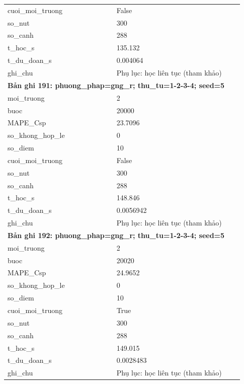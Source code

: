 \begin{longtable}{p{0.43\linewidth}p{0.50\linewidth}}
cuoi\_\allowbreak moi\_\allowbreak truong & False \\
so\_\allowbreak nut & 300 \\
so\_\allowbreak canh & 288 \\
t\_\allowbreak hoc\_\allowbreak s & 135.132 \\
t\_\allowbreak du\_\allowbreak doan\_\allowbreak s & 0.004064 \\
ghi\_\allowbreak chu & Phụ lục: học liên tục (tham khảo) \\
\midrule
\multicolumn{2}{p{0.95\linewidth}}{\textbf{Bản ghi 191: phuong\_phap=gng\_r; thu\_tu=1-2-3-4; seed=5}} \\
moi\_\allowbreak truong & 2 \\
buoc & 20000 \\
MAPE\_\allowbreak Csp & 23.7096 \\
so\_\allowbreak khong\_\allowbreak hop\_\allowbreak le & 0 \\
so\_\allowbreak diem & 10 \\
cuoi\_\allowbreak moi\_\allowbreak truong & False \\
so\_\allowbreak nut & 300 \\
so\_\allowbreak canh & 288 \\
t\_\allowbreak hoc\_\allowbreak s & 148.846 \\
t\_\allowbreak du\_\allowbreak doan\_\allowbreak s & 0.0056942 \\
ghi\_\allowbreak chu & Phụ lục: học liên tục (tham khảo) \\
\midrule
\multicolumn{2}{p{0.95\linewidth}}{\textbf{Bản ghi 192: phuong\_phap=gng\_r; thu\_tu=1-2-3-4; seed=5}} \\
moi\_\allowbreak truong & 2 \\
buoc & 20020 \\
MAPE\_\allowbreak Csp & 24.9652 \\
so\_\allowbreak khong\_\allowbreak hop\_\allowbreak le & 0 \\
so\_\allowbreak diem & 10 \\
cuoi\_\allowbreak moi\_\allowbreak truong & True \\
so\_\allowbreak nut & 300 \\
so\_\allowbreak canh & 288 \\
t\_\allowbreak hoc\_\allowbreak s & 149.015 \\
t\_\allowbreak du\_\allowbreak doan\_\allowbreak s & 0.0028483 \\
ghi\_\allowbreak chu & Phụ lục: học liên tục (tham khảo) \\

\end{longtable}
